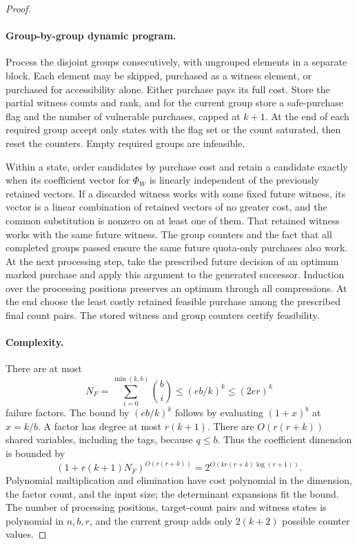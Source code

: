 \documentclass[11pt]{article}
\theoremstyle{definition}
\theoremstyle{remark}\newtheorem{remark}[theorem]{Remark}
\begin{document}
\begin{proof}
\paragraph{Group-by-group dynamic program.}
Process the disjoint groups consecutively, with ungrouped
elements in a separate block. Each element may be skipped,
purchased as a witness element, or purchased for accessibility
alone. Either purchase pays its full cost. Store the partial
witness counts and rank, and for the current group store a
safe-purchase flag and the number of vulnerable purchases,
capped at $k+1$. At the end of each required group accept
only states with the flag set or the count saturated, then
reset the counters. Empty required groups are infeasible.

Within a state, order candidates by purchase cost and retain
a candidate exactly when its coefficient vector for $\Phi_W$
is linearly independent of the previously retained vectors.
If a discarded witness works with some fixed future witness,
its vector is a linear combination of retained vectors of
no greater cost, and the common substitution is nonzero on
at least one of them. That retained witness works with the
same future witness. The group counters and the fact that all
completed groups passed ensure the same future quota-only
purchases also work. At the next processing step, take the
prescribed future decision of an optimum marked purchase
and apply this argument to the generated successor. Induction
over the processing positions preserves an optimum through
all compressions. At the end choose the least costly retained
feasible purchase among the prescribed final count pairs.
The stored witness and group counters certify feasibility.

\paragraph{Complexity.}
There are at most
\[
 N_F=\sum_{i=0}^{\min(k,b)}\binom bi
       \le (eb/k)^k\le (2er)^k
\]
failure factors. The bound by $(eb/k)^k$ follows by evaluating
$(1+x)^b$ at $x=k/b$. A factor has degree at most $r(k+1)$.
There are $O(r(r+k))$ shared variables, including the tags,
because $q\le b$. Thus the coefficient dimension is bounded by
\[
 (1+r(k+1)N_F)^{O(r(r+k))}
   =2^{O(kr(r+k)\log(r+1))}.
\]
Polynomial multiplication and elimination have cost polynomial
in the dimension, the factor count, and the input size;
the determinant expansions fit the bound. The number of
processing positions, target-count pairs and witness states
is polynomial in $n,b,r$, and the current group adds only
$2(k+2)$ possible counter values.


\end{proof}
\end{document}
